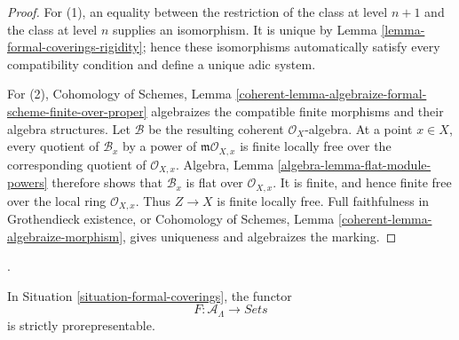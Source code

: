 \begin{proof}
For (1), an equality between the restriction of the class at level $n + 1$
and the class at level $n$ supplies an isomorphism. It is unique by Lemma
\ref{lemma-formal-coverings-rigidity}; hence these isomorphisms automatically
satisfy every compatibility condition and define a unique adic system.

For (2), Cohomology of Schemes, Lemma
\ref{coherent-lemma-algebraize-formal-scheme-finite-over-proper} algebraizes
the compatible finite morphisms and their algebra structures. Let
$\mathcal{B}$ be the resulting coherent $\mathcal{O}_X$-algebra. At a point
$x \in X$, every quotient of $\mathcal{B}_x$ by a power of
$\mathfrak m\mathcal{O}_{X,x}$ is finite locally free over the corresponding
quotient of $\mathcal{O}_{X,x}$. Algebra, Lemma
\ref{algebra-lemma-flat-module-powers} therefore shows that
$\mathcal{B}_x$ is flat over $\mathcal{O}_{X,x}$. It is finite, and hence
finite free over the local ring $\mathcal{O}_{X,x}$. Thus $Z \to X$ is finite
locally free. Full faithfulness in Grothendieck existence, or Cohomology of
Schemes, Lemma \ref{coherent-lemma-algebraize-morphism}, gives uniqueness and
algebraizes the marking.
\end{proof}

\begin{proposition}
\label{proposition-formal-coverings-prorepresentable}
\begin{reference}
\cite[Expos\'e 195, C, Proposition 5.1, pp. 388--389]{FGA}.
\end{reference}
In Situation \ref{situation-formal-coverings}, the functor
$$
F : \mathcal{A}_\Lambda \longrightarrow \textit{Sets}
$$
is strictly prorepresentable.
\end{proposition}

